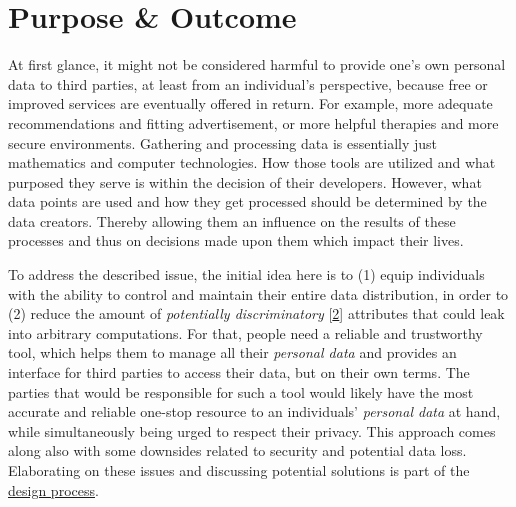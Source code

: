 \documentclass[12pt,english,a4paper,titlepage,cleardoublepage=empty,dottedtoc]{report}
\begin{document}
\section{Purpose \& Outcome}\label{purpose-outcome}

At first glance, it might not be considered harmful to provide one's own
personal data to third parties, at least from an individual's
perspective, because free or improved services are eventually offered in
return. For example, more adequate recommendations and fitting
advertisement, or more helpful therapies and more secure environments.
Gathering and processing data is essentially just mathematics and
computer technologies. How those tools are utilized and what purposed
they serve is within the decision of their developers. However, what
data points are used and how they get processed should be determined by
the data creators. Thereby allowing them an influence on the results of
these processes and thus on decisions made upon them which impact their
lives.

To address the described issue, the initial idea here is to (1) equip
individuals with the ability to control and maintain their entire data
distribution, in order to (2) reduce the amount of \emph{potentially
discriminatory}
{[}\protect\hyperlink{ref-paper_2008_discrimination-aware-data-mining}{2}{]}
attributes that could leak into arbitrary computations. For that, people
need a reliable and trustworthy tool, which helps them to manage all
their \emph{personal data} and provides an interface for third parties
to access their data, but on their own terms. The parties that would be
responsible for such a tool would likely have the most accurate and
reliable one-stop resource to an individuals' \emph{personal data} at
hand, while simultaneously being urged to respect their privacy. This
approach comes along also with some downsides related to security and
potential data loss. Elaborating on these issues and discussing
potential solutions is part of the
\protect\hyperlink{design-discussion}{design process}.
\end{document}
